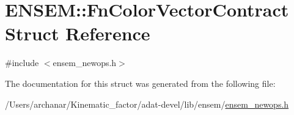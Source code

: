 \hypertarget{structENSEM_1_1FnColorVectorContract}{}\section{E\+N\+S\+EM\+:\+:Fn\+Color\+Vector\+Contract Struct Reference}
\label{structENSEM_1_1FnColorVectorContract}


{\ttfamily \#include $<$ensem\+\_\+newops.\+h$>$}



The documentation for this struct was generated from the following file\+:\begin{DoxyCompactItemize}
\item 
/\+Users/archanar/\+Kinematic\+\_\+factor/adat-\/devel/lib/ensem/\mbox{\hyperlink{adat-devel_2lib_2ensem_2ensem__newops_8h}{ensem\+\_\+newops.\+h}}\end{DoxyCompactItemize}
